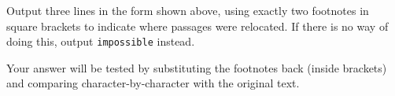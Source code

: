 

Output three lines in the form shown above, using exactly two footnotes in
square brackets to indicate where passages were relocated. If there is no way of
doing this, output \texttt{impossible} instead.

Your answer will be tested by substituting the footnotes back (inside brackets)
and comparing character-by-character with the original text.
